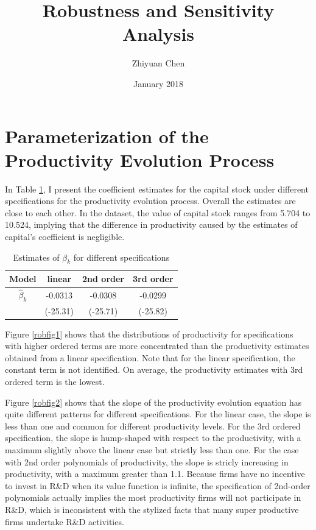 \documentclass{article}
\title{Robustness and Sensitivity Analysis}
\author{Zhiyuan Chen}
\date{January 2018}
\begin{document}
\maketitle

\section{Parameterization of the Productivity Evolution Process}
In Table \ref{robT1}, I present the coefficient estimates for the capital stock under different specifications for the productivity evolution process. Overall the estimates are close to each other. In the dataset, the value of capital stock ranges from 5.704 to 10.524, implying that the difference in productivity caused by the estimates of capital's coefficient is negligible. 


\begin{table}[h]
    \caption{Estimates of $\beta_{k}$ for different specifications}
    \label{robT1}
    \centering
    \begin{tabular}{cccc}
\hline\hline 
    Model &  linear & 2nd order & 3rd order \\
    \hline
     $\hat{\beta}_k$ & -0.0313\sym{**} & -0.0308\sym{**}&-0.0299\sym{**}  \\
                     &(-25.31)         &(-25.71)        &(-25.82) \\
   \hline
    \end{tabular}
\end{table}

Figure \ref{robfig1} shows that the distributions of productivity for specifications with higher ordered terms are more concentrated than the productivity estimates obtained from a linear specification. Note that for the linear specification, the constant term is not identified. On average, the productivity estimates with 3rd ordered term is the lowest.

Figure \ref{robfig2} shows that the slope of the productivity evolution equation has quite different patterns for different specifications. For the linear case, the slope is less than one and common for different productivity levels. For the 3rd ordered specification, the slope is hump-shaped with respect to the productivity, with a maximum slightly above the linear case but strictly less than one. For the case with 2nd order polynomials of productivity, the slope is stricly increasing in productivity, with a maximum greater than 1.1. Because firms have no incentive to invest in R\&D when its value function is infinite, the specification of 2nd-order polynomials actually implies the most productivity firms will not participate in R\&D, which is inconsistent with the stylized facts that many super productive firms undertake R\&D activities. 
\end{document}
